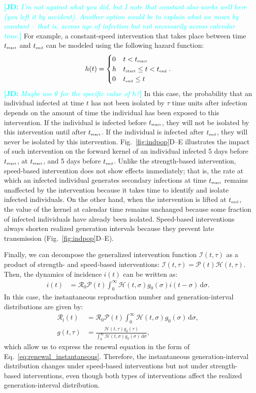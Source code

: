 \documentclass[12pt]{article}
\newcommand{\comment}{\showcomment}
\newcommand{\showcomment}[3]{\textcolor{#1}{\textbf{[#2: }\textsl{#3}\textbf{]}}}
\newcommand{\jd}[1]{\comment{cyan}{JD}{#1}}
\newcommand{\eref}[1]{Eq.~\ref{eq:#1}}
\newcommand{\fref}[1]{Fig.~\ref{fig:#1}}
\newcommand{\Rx}[1]{\ensuremath{{\mathcal R}_{#1}}\xspace}
\newcommand{\Ro}{\Rx{0}}
\newcommand{\Ri}{\Rx{\mathrm{i}}}
\newcommand{\RR}{\ensuremath{{\mathcal R}}\xspace}
\newcommand{\tsub}[2]{#1_{{\textrm{\tiny #2}}}}
\newcommand{\dd}[1]{\ensuremath{\, \mathrm{d}#1}}
\newcommand{\dsigma}{\dd{\sigma}}
\newcommand{\tstart}{\ensuremath{\tsub{t}{start}}\xspace}
\newcommand{\tend}{\ensuremath{\tsub{t}{end}}\xspace}
\newcommand{\PP}{\ensuremath{\mathcal P}}
\newcommand{\II}{\ensuremath{\mathcal I}}
\newcommand{\HH}{\ensuremath{\mathcal H}}
\begin{document}
\jd{I'm not against what you did, but I note that constant also works well here (you left it by accident). Another option would be to explain what we mean by constant -- that is, across age of infection but not necessarily across calendar time.}
For example, a constant-speed intervention that takes place between time \tstart and \tend can be modeled using the following hazard function:
\begin{equation}
h(t) = \begin{cases}
0 & t < \tstart\\
h & \tstart \leq t < \tend\\
0 & \tend \leq t
\end{cases}.
\end{equation}
\jd{Maybe use $\theta$ for the specific value of $h$?}
In this case, the probability that an individual infected at time $t$ has not been isolated by $\tau$ time units after infection depends on the amount of time the individual has been exposed to this intervention.
If the individual is infected before $\tstart$, they will not be isolated by this intervention until after $\tstart$.
If the individual is infected after $\tend$, they will never be isolated by this intervention.
\fref{indpop}D--E illustrates the impact of such intervention on the forward kernel of an individual infected 5 days before $\tstart$, at $\tstart$, and 5 days before $\tend$.
Unlike the strength-based intervention, speed-based intervention does not show effects immediately;
that is, the rate at which an infected individual generates secondary infections at time $\tstart$ remains unaffected by the intervention because it takes time to identify and isolate infected individuals.
On the other hand, when the intervention is lifted at $\tend$, the value of the kernel at calendar time remains unchanged because some fraction of infected individuals have already been isolated.
Speed-based interventions always shorten realized generation intervals because they prevent late transmission (\fref{indpop}D--E).

Finally, we can decompose the generalized intervention function $\II(t, \tau)$ as a product of strength- and speed-based interventions: $\II(t, \tau) = \PP(t) \HH(t, \tau)$. 
Then, the dynamics of incidence $i(t)$ can be written as:
\begin{align}
i(t) &= \Ro \PP(t) \int_0^\infty \HH(t, \sigma) g_0(\sigma) i(t-\sigma)\dsigma.
\end{align}
In this case, the instantaneous reproduction number and generation-interval distributions are given by:
\begin{align}
\Ri(t) &= \RR_0 \PP(t) \int_0^\infty \HH(t,\sigma) g_0(\sigma) \dsigma,\\
g(t, \tau) &= \frac{\HH(t,\tau) g_0(\tau)}{\int_0^\infty \HH(t,\sigma) g_0(\sigma) \dsigma},
\end{align}
which allow us to express the renewal equation in the form of \eref{renewal_instantaneous}.
Therefore, the instantaneous generation-interval distribution changes under speed-based interventions but not under strength-based interventions, even though both types of interventions affect the realized generation-interval distribution.
\end{document}
